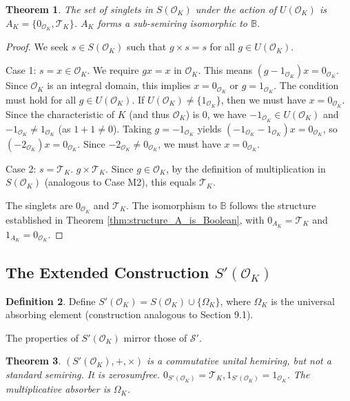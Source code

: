 \documentclass[11pt, a4paper]{article}
\theoremstyle{plain}
\newtheorem{theorem}{Theorem}[section]
\theoremstyle{definition}
\newtheorem{definition}[theorem]{Definition}
\numberwithin{equation}{section}
\newcommand{\Tobj}{\mathcal{T}} %
\newcommand{\OmegaObj}{\Omega} %
\newcommand{\SemiringSPrime}{\mathcal{S}'}
\newcommand{\Bool}{\mathbb{B}} %
\newcommand{\OK}{\mathcal{O}_K}
\newcommand{\SOK}{S(\OK)}
\newcommand{\SPOK}{S'(\OK)}
\begin{document}
\begin{theorem}\label{thm:singlets_SOK}
The set of singlets in $\SOK$ under the action of $U(\OK)$ is $A_K=\{0_{\OK}, \Tobj_K\}$. $A_K$ forms a sub-semiring isomorphic to $\Bool$.
\end{theorem}
\begin{proof}
We seek $s \in \SOK$ such that $g\times s = s$ for all $g \in U(\OK)$.

Case 1: $s=x \in \OK$. We require $gx=x$ in $\OK$. This means $(g-1_{\OK})x=0_{\OK}$.
Since $\OK$ is an integral domain, this implies $x=0_{\OK}$ or $g=1_{\OK}$.
The condition must hold for all $g \in U(\OK)$. If $U(\OK) \neq \{1_{\OK}\}$, then we must have $x=0_{\OK}$.
Since the characteristic of $K$ (and thus $\OK$) is 0, we have $-1_{\OK} \in U(\OK)$ and $-1_{\OK} \neq 1_{\OK}$ (as $1+1\neq 0$).
Taking $g=-1_{\OK}$ yields $(-1_{\OK}-1_{\OK})x=0_{\OK}$, so $(-2_{\OK})x=0_{\OK}$. Since $-2_{\OK} \neq 0_{\OK}$, we must have $x=0_{\OK}$.

Case 2: $s=\Tobj_K$. $g\times \Tobj_K$. Since $g \in \OK$, by the definition of multiplication in $\SOK$ (analogous to Case M2), this equals $\Tobj_K$.

The singlets are $0_{\OK}$ and $\Tobj_K$.
The isomorphism to $\Bool$ follows the structure established in Theorem \ref{thm:structure_A_is_Boolean}, with $0_{A_K}=\Tobj_K$ and $1_{A_K}=0_{\OK}$.
\end{proof}

\subsection{The Extended Construction $\SPOK$}

\begin{definition}
Define $\SPOK = \SOK \cup \{\OmegaObj_K\}$, where $\OmegaObj_K$ is the universal absorbing element (construction analogous to Section 9.1).
\end{definition}

The properties of $\SPOK$ mirror those of $\SemiringSPrime$.

\begin{theorem}
$(\SPOK, +, \times)$ is a commutative unital hemiring, but not a standard semiring. It is zerosumfree. $0_{\SPOK}=\Tobj_K, 1_{\SPOK}=1_{\OK}$. The multiplicative absorber is $\OmegaObj_K$.
\end{theorem}
\end{document}
